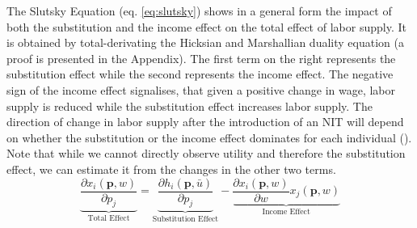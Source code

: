 The Slutsky Equation (eq. \ref{eq:slutsky}) shows in a general form the impact of both the substitution and the income effect on the total effect of labor supply. It is obtained by total-derivating the Hicksian and Marshallian duality equation (a proof is presented in the Appendix). The first term on the right represents the substitution effect while the second represents the income effect. The negative sign of the income effect signalises, that given a positive change in wage, labor supply is reduced while the substitution effect increases labor supply. The direction of change in labor supply after the introduction of an NIT will depend on whether the substitution or the income effect dominates for each individual (\cite{varian1992}). Note that while we cannot directly observe utility and therefore the substitution effect, we can estimate it from the changes in the other two terms. \\

\begin{equation}
  \underbrace{\frac{\partial x_i (\mathbf{p},w)}{\partial p_j}}_{\text{Total Effect}}
=\underbrace{\frac{\partial h_i (\mathbf{p},\bar u)}{\partial p_j}}_{\text{Substitution Effect}}
-\underbrace{\frac{\partial x_i (\mathbf{p}, w)}{\partial w}
x_j(\mathbf{p},w)}_{\text{Income Effect}}
\label{eq:slutsky}
\end{equation}

